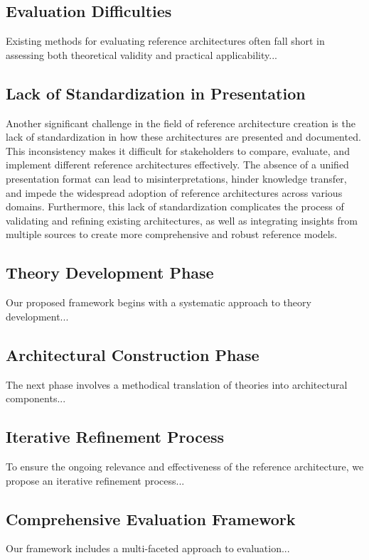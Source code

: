 \documentclass[12pt,a4paper]{article}
\begin{document}
\subsection{Evaluation Difficulties}
\label{subsec:evaluation}
Existing methods for evaluating reference architectures often fall short in assessing both theoretical validity and practical applicability...

\subsection{Lack of Standardization in Presentation}
\label{subsec:standardization}
Another significant challenge in the field of reference architecture creation is the lack of standardization in how these architectures are presented and documented. This inconsistency makes it difficult for stakeholders to compare, evaluate, and implement different reference architectures effectively. The absence of a unified presentation format can lead to misinterpretations, hinder knowledge transfer, and impede the widespread adoption of reference architectures across various domains. Furthermore, this lack of standardization complicates the process of validating and refining existing architectures, as well as integrating insights from multiple sources to create more comprehensive and robust reference models.

\subsection{Theory Development Phase}
\label{subsec:theory-dev}
Our proposed framework begins with a systematic approach to theory development...

\subsection{Architectural Construction Phase}
\label{subsec:arch-construction}
The next phase involves a methodical translation of theories into architectural components...

\subsection{Iterative Refinement Process}
\label{subsec:refinement}
To ensure the ongoing relevance and effectiveness of the reference architecture, we propose an iterative refinement process...

\subsection{Comprehensive Evaluation Framework}
\label{subsec:eval-framework}
Our framework includes a multi-faceted approach to evaluation...
\end{document}
